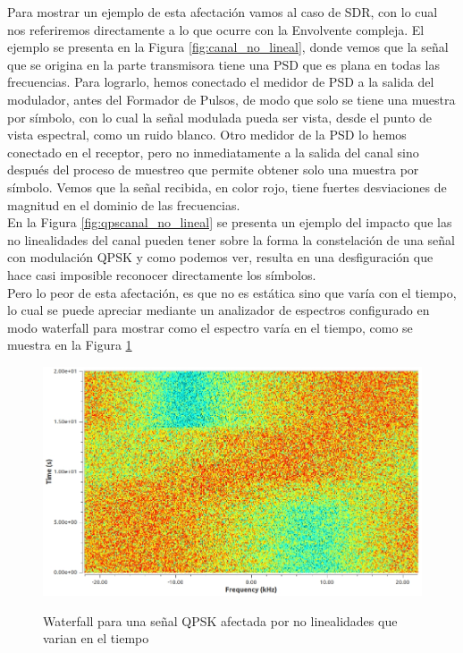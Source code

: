Para mostrar un ejemplo de esta afectación vamos al caso de SDR, con lo cual nos referiremos directamente a lo que ocurre con la Envolvente compleja. El ejemplo se presenta en la Figura \ref{fig:canal_no_lineal}, donde vemos que la señal que se origina en la parte transmisora tiene una PSD que es plana en todas las frecuencias. Para lograrlo, hemos conectado el medidor de PSD a la salida del modulador, antes del Formador de Pulsos, de modo que solo se tiene una muestra por símbolo, con lo cual la señal modulada pueda ser vista, desde el punto de vista espectral, como un ruido blanco. Otro medidor de la PSD lo hemos conectado en el receptor, pero no inmediatamente a la salida del canal sino después del proceso de muestreo que permite obtener solo una muestra por símbolo. Vemos que la señal recibida, en color rojo, tiene fuertes desviaciones de magnitud en el dominio de las frecuencias.\\
En la Figura \ref{fig:qpscanal_no_lineal} se presenta un ejemplo del impacto que las no linealidades del canal pueden tener sobre la forma la constelación de una señal con modulación QPSK y como podemos ver, resulta en una desfiguración que hace casi imposible reconocer directamente los símbolos.\\

Pero lo peor de esta afectación, es que no es estática sino que varía con el tiempo, lo cual se puede apreciar mediante un analizador de espectros configurado en modo waterfall para mostrar como el espectro varía en el tiempo, como se muestra en la Figura \ref{fig:waterfall_canal_no_lineal}
\begin{figure}[h!]
	\captionsetup{justification = raggedright, singlelinecheck = false}
	\caption{Waterfall para una señal QPSK afectada por no linealidades que varian en el tiempo} 
	\centering
	\includegraphics[scale=0.35]{Imagenes/waterfall_canal_no_lineal.jpg}
	\label{fig:waterfall_canal_no_lineal}
\end{figure}
